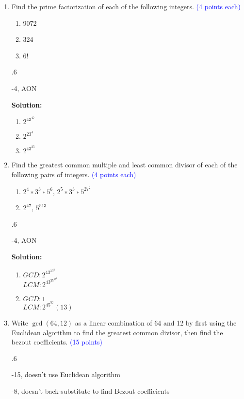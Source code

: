 \documentclass{article}
\newcommand{\pt}[1]{\textcolor{blue}{(#1 points)}}
\newcommand{\pte}[1]{\textcolor{blue}{(#1 points each)}}
\newenvironment{solution}
{
\par
\color{blue}
\textbf{Solution:}
}
{
\par
}
\newenvironment{rubric}
{
\par
\begin{spacing}{.6}
\begin{itshape}
\color{red}

}
{
\end{itshape}
\end{spacing}
\par
}
\begin{document}
\begin{enumerate}
\item Find the prime factorization of each of the following integers. \pte{4}
\begin{enumerate}
    \item 9072
    \item 324
    \item 6!
\end{enumerate}

\begin{rubric}
    -4, AON
\end{rubric}

\begin{solution}
\begin{enumerate}
    \item $2^43^47$
    \item $2^23^4$
    \item $2^43^25$
\end{enumerate}
\end{solution}

\item Find the greatest common multiple and least common divisor of each of the following pairs of integers. \pte{4}
\begin{enumerate}
    \item $2^4 ∗3^3 ∗5^6$, $2^5 ∗3^3 ∗5^27^2$
    \item $2^47$, $5^513$
\end{enumerate}

\begin{rubric}
    -4, AON
\end{rubric}

\begin{solution}
\begin{enumerate}
    \item $GCD: 2^43^35^2$ \\ $LCM: 2^43^35^67^2$
    \item $GCD: 1$ \\ $LCM: 2^45^57(13)$
\end{enumerate}
\end{solution}

\item Write $\gcd(64,12)$ as a linear combination of 64 and 12 by first using the Euclidean algorithm to find the greatest common divisor, then find the bezout coefficients. \pt{15}


\begin{rubric}
    -15, doesn't use Euclidean algorithm
    
    -8, doesn't back-substitute to find Bezout coefficients
    

\end{rubric}
\end{enumerate}
\end{document}
